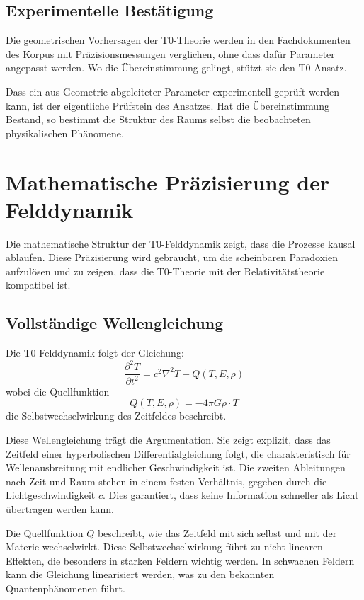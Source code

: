 	\subsection{Experimentelle Bestätigung}
	
	Die geometrischen Vorhersagen der T0-Theorie werden in den Fachdokumenten des Korpus mit Präzisionsmessungen verglichen, ohne dass dafür Parameter angepasst werden. Wo die Übereinstimmung gelingt, stützt sie den T0-Ansatz.
	
	Dass ein aus Geometrie abgeleiteter Parameter experimentell geprüft werden kann, ist der eigentliche Prüfstein des Ansatzes. Hat die Übereinstimmung Bestand, so bestimmt die Struktur des Raums selbst die beobachteten physikalischen Phänomene.
	
	\section{Mathematische Präzisierung der Felddynamik}
	
	Die mathematische Struktur der T0-Felddynamik zeigt, dass die Prozesse kausal ablaufen. Diese Präzisierung wird gebraucht, um die scheinbaren Paradoxien aufzulösen und zu zeigen, dass die T0-Theorie mit der Relativitätstheorie kompatibel ist.
	
	\subsection{Vollständige Wellengleichung}
	
	Die T0-Felddynamik folgt der Gleichung:
	\begin{equation}
		\frac{\partial^2 T}{\partial t^2} = c^2\nabla^2 T + Q(T, E, \rho) \label{eq:wave_equation}
	\end{equation}
	wobei die Quellfunktion
	\begin{equation}
		Q(T, E, \rho) = -4\pi G \rho \cdot T
	\end{equation}
	die Selbstwechselwirkung des Zeitfeldes beschreibt.
	
	Diese Wellengleichung trägt die Argumentation. Sie zeigt explizit, dass das Zeitfeld einer hyperbolischen Differentialgleichung folgt, die charakteristisch für Wellenausbreitung mit endlicher Geschwindigkeit ist. Die zweiten Ableitungen nach Zeit und Raum stehen in einem festen Verhältnis, gegeben durch die Lichtgeschwindigkeit $c$. Dies garantiert, dass keine Information schneller als Licht übertragen werden kann.
	
	Die Quellfunktion $Q$ beschreibt, wie das Zeitfeld mit sich selbst und mit der Materie wechselwirkt. Diese Selbstwechselwirkung führt zu nicht-linearen Effekten, die besonders in starken Feldern wichtig werden. In schwachen Feldern kann die Gleichung linearisiert werden, was zu den bekannten Quantenphänomenen führt.
	
